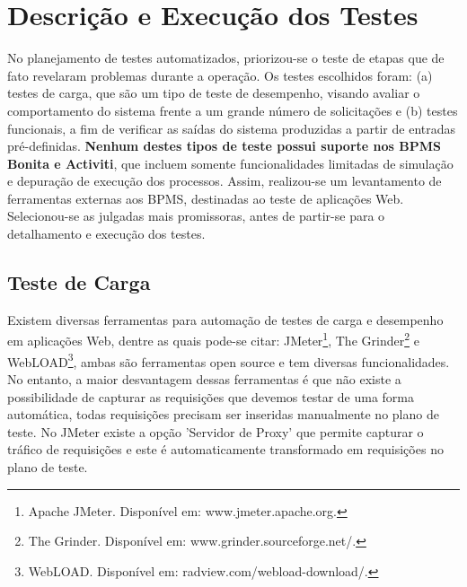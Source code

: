 \documentclass[12pt]{article}
\begin{document}
\section{Descrição e Execução dos Testes}
No planejamento de testes automatizados, priorizou-se o teste de etapas que de fato revelaram problemas durante a operação.
Os testes escolhidos foram: (a) testes de carga, que são um tipo de teste de desempenho, visando avaliar o comportamento do sistema frente a um grande número de solicitações e (b) testes funcionais, a fim de verificar as saídas do sistema produzidas a partir de entradas pré-definidas. \textbf{Nenhum destes tipos de teste possui suporte nos BPMS Bonita e Activiti}, que incluem somente funcionalidades limitadas de simulação e depuração de execução dos processos. Assim, realizou-se um levantamento de ferramentas externas aos BPMS, destinadas ao teste de aplicações Web. Selecionou-se as julgadas mais promissoras, antes de partir-se para o detalhamento e execução dos testes.

\subsection{Teste de Carga}

Existem diversas ferramentas para automação de testes de carga e desempenho em aplicações Web, dentre as quais pode-se citar: JMeter\footnote{Apache JMeter. Disponível em: www.jmeter.apache.org.}, The Grinder\footnote{The Grinder. Disponível em: www.grinder.sourceforge.net/.} e WebLOAD\footnote{WebLOAD. Disponível em: radview.com/webload-download/.}, ambas são ferramentas open source e tem diversas funcionalidades. No entanto, a maior desvantagem dessas ferramentas é que não existe a possibilidade de capturar as requisições que devemos testar de uma forma automática, todas requisições precisam ser inseridas manualmente no plano de teste. No JMeter existe a opção 'Servidor de Proxy' que permite capturar o tráfico de requisições e este é automaticamente transformado em requisições no plano de teste.
\end{document}
